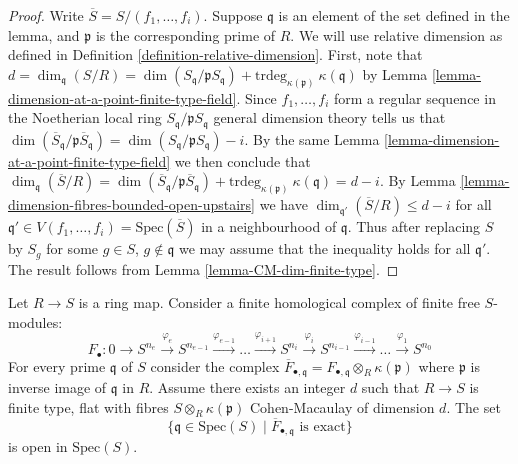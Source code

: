 \begin{proof}
Write $\overline{S} = S/(f_1,\ldots,f_i)$.
Suppose $\mathfrak q$ is an element of the set defined in the
lemma, and $\mathfrak p$ is the corresponding prime of $R$.
We will use relative dimension as defined in
Definition \ref{definition-relative-dimension}.
First, note that $d = \dim_{\mathfrak q}(S/R) = 
\dim(S_{\mathfrak q}/\mathfrak pS_{\mathfrak q}) +
\text{trdeg}_{\kappa(\mathfrak p)}\ \kappa(\mathfrak q)$
by Lemma \ref{lemma-dimension-at-a-point-finite-type-field}.
Since $f_1, \ldots, f_i$ form a regular sequence in the
Noetherian local ring $S_{\mathfrak q}/\mathfrak pS_{\mathfrak q}$
general dimension theory tells us that
$\dim(\overline{S}_{\mathfrak q}/\mathfrak p\overline{S}_{\mathfrak q})
= \dim(S_{\mathfrak q}/\mathfrak pS_{\mathfrak q}) - i$.
By the same Lemma \ref{lemma-dimension-at-a-point-finite-type-field}
we then conclude that $\dim_{\mathfrak q}(\overline{S}/R)
= \dim(\overline{S}_{\mathfrak q}/\mathfrak p\overline{S}_{\mathfrak q}) +
\text{trdeg}_{\kappa(\mathfrak p)}\ \kappa(\mathfrak q)
= d - i$. By Lemma
\ref{lemma-dimension-fibres-bounded-open-upstairs}
we have $\dim_{\mathfrak q'}(\overline{S}/R) \leq d - i$
for all $\mathfrak q' \in V(f_1,\ldots, f_i) = \text{Spec}(\overline{S})$
in a neighbourhood of $\mathfrak q$. Thus after replacing
$S$ by $S_g$ for some $g \in S$, $g \not \in \mathfrak q$
we may assume that the inequality holds for all
$\mathfrak q'$. The result follows from Lemma
\ref{lemma-CM-dim-finite-type}.
\end{proof}

\begin{lemma}
\label{lemma-exact-on-fibres-open}
Let $R \to S$ is a ring map.
Consider a finite homological complex of 
finite free $S$-modules:
$$
F_{\bullet} :
0
\to
S^{n_e}
\xrightarrow{\varphi_e}
S^{n_{e-1}}
\xrightarrow{\varphi_{e-1}}
\ldots
\xrightarrow{\varphi_{i+1}}
S^{n_i}
\xrightarrow{\varphi_i}
S^{n_{i-1}}
\xrightarrow{\varphi_{i-1}}
\ldots
\xrightarrow{\varphi_1}
S^{n_0}
$$
For every prime $\mathfrak q$ of $S$ consider the
complex $\overline{F}_{\bullet, \mathfrak q} =
F_{\bullet, \mathfrak q} \otimes_R \kappa(\mathfrak p)$
where $\mathfrak p$ is inverse image of $\mathfrak q$ in $R$.
Assume there exists an integer $d$ such
that $R \to S$ is finite type, flat
with fibres $S \otimes_R \kappa(\mathfrak p)$
Cohen-Macaulay of dimension $d$.
The set
$$
\{\mathfrak q \in \text{Spec}(S) \mid
\overline{F}_{\bullet, \mathfrak q}\text{ is exact}\}
$$
is open in $\text{Spec}(S)$.
\end{lemma}


